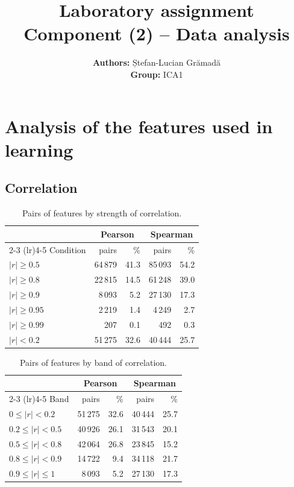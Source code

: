\documentclass[a4paper, 11pt]{article}
\title{\textbf{Laboratory assignment} \\[1ex] \large \textbf{Component} (2) -- Data analysis}
\author{\textbf{Authors:} Ștefan-Lucian Grămadă\\ \textbf{Group:} ICA1}
\begin{document}
\maketitle

\section{Analysis of the features used in learning}

\subsection{Correlation}


\begin{table}[htbp]
\centering
\caption{Pairs of features by strength of correlation.}
\label{tab:correlation}
\begin{tabular}{lrrrr}
\toprule
 & \multicolumn{2}{c}{Pearson} & \multicolumn{2}{c}{Spearman} \\
\cmidrule(lr){2-3} \cmidrule(lr){4-5}
Condition & pairs & \% & pairs & \% \\
\midrule
$|r| \geq 0.5$  & 64\,879 & 41.3 & 85\,093 & 54.2 \\
$|r| \geq 0.8$  & 22\,815 & 14.5 & 61\,248 & 39.0 \\
$|r| \geq 0.9$  & 8\,093  & 5.2  & 27\,130 & 17.3 \\
$|r| \geq 0.95$ & 2\,219  & 1.4  & 4\,249  & 2.7 \\
$|r| \geq 0.99$ & 207     & 0.1  & 492     & 0.3 \\
$|r| < 0.2$     & 51\,275 & 32.6 & 40\,444 & 25.7 \\
\bottomrule
\end{tabular}
\end{table}

\begin{table}[htbp]
\centering
\caption{Pairs of features by band of correlation.}
\label{tab:correlationbands}
\begin{tabular}{lrrrr}
\toprule
 & \multicolumn{2}{c}{Pearson} & \multicolumn{2}{c}{Spearman} \\
\cmidrule(lr){2-3} \cmidrule(lr){4-5}
Band & pairs & \% & pairs & \% \\
\midrule
$0 \leq |r| < 0.2$   & 51\,275 & 32.6 & 40\,444 & 25.7 \\
$0.2 \leq |r| < 0.5$ & 40\,926 & 26.1 & 31\,543 & 20.1 \\
$0.5 \leq |r| < 0.8$ & 42\,064 & 26.8 & 23\,845 & 15.2 \\
$0.8 \leq |r| < 0.9$ & 14\,722 & 9.4  & 34\,118 & 21.7 \\
$0.9 \leq |r| \leq 1$ & 8\,093 & 5.2  & 27\,130 & 17.3 \\
\bottomrule
\end{tabular}
\end{table}
\end{document}
